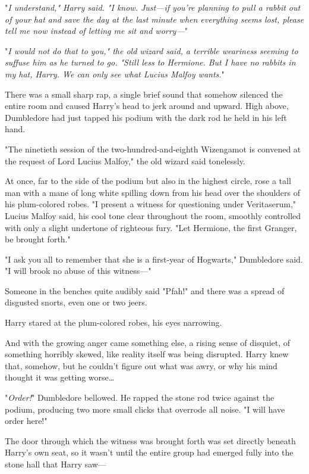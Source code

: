"\emph{I understand," Harry said. "I know. Just---if you're planning to pull a 
rabbit out of your hat and save the day at the last minute when everything 
seems lost, please tell me now instead of letting me sit and worry---}"

"\emph{I would not do that to you," the old wizard said, a terrible weariness 
seeming to suffuse him as he turned to go. "Still less to Hermione. But I have 
no rabbits in my hat, Harry. We can only see what Lucius Malfoy wants.}"

There was a small sharp rap, a single brief sound that somehow silenced the 
entire room and caused Harry's head to jerk around and upward. High above, 
Dumbledore had just tapped his podium with the dark rod he held in his left 
hand.

"The ninetieth session of the two-hundred-and-eighth Wizengamot is convened at 
the request of Lord Lucius Malfoy," the old wizard said tonelessly.

At once, far to the side of the podium but also in the highest circle, rose a 
tall man with a mane of long white spilling down from his head over the 
shoulders of his plum-colored robes. "I present a witness for questioning under 
Veritaserum," Lucius Malfoy said, his cool tone clear throughout the room, 
smoothly controlled with only a slight undertone of righteous fury. "Let 
Hermione, the first Granger, be brought forth."

"I ask you all to remember that she is a first-year of Hogwarts," Dumbledore 
said. "I will brook no abuse of this witness---"

Someone in the benches quite audibly said "Pfah!" and there was a spread of 
disgusted snorts, even one or two jeers.

Harry stared at the plum-colored robes, his eyes narrowing.

And with the growing anger came something else, a rising sense of disquiet, of 
something horribly skewed, like reality itself was being disrupted. Harry knew 
that, somehow, but he couldn't figure out what was awry, or why his mind 
thought it was getting worse{\ldots}

"\emph{Order!}" Dumbledore bellowed. He rapped the stone rod twice against the 
podium, producing two more small clicks that overrode all noise. "I will have 
order here!"

The door through which the witness was brought forth was set directly beneath 
Harry's own seat, so it wasn't until the entire group had emerged fully into 
the stone hall that Harry saw---


